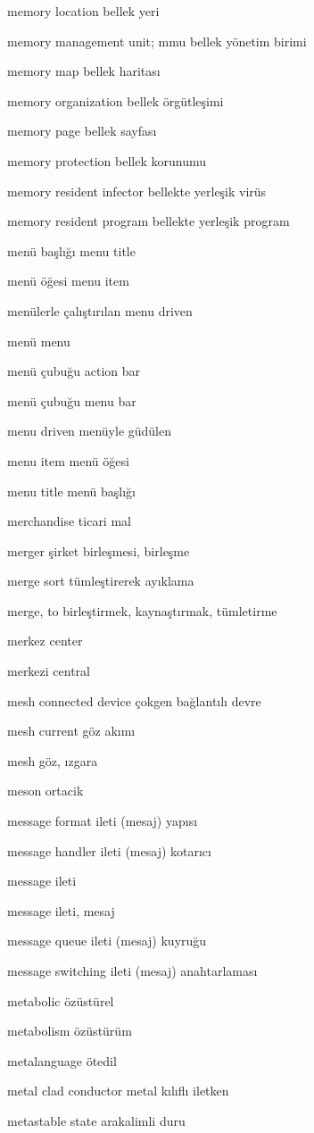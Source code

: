 \documentclass[12pt,fleqn]{article}\usepackage{../../common}
\begin{document}
memory location bellek yeri

memory management unit; mmu bellek yönetim birimi

memory map bellek haritası

memory organization bellek örgütleşimi

memory page bellek sayfası

memory protection bellek korunumu

memory resident infector bellekte yerleşik virüs

memory resident program bellekte yerleşik program

menü başlığı menu title

menü öğesi menu item

menülerle çalıştırılan menu driven

menü menu

menü çubuğu action bar

menü çubuğu menu bar

menu driven menüyle güdülen

menu item menü öğesi

menu title menü başlığı

merchandise ticari mal

merger şirket birleşmesi, birleşme

merge sort tümleştirerek ayıklama

merge, to birleştirmek, kaynaştırmak, tümletirme

merkez center

merkezi central

mesh connected device çokgen bağlantılı devre

mesh current göz akımı

mesh göz, ızgara

meson ortacik

message format ileti (mesaj) yapısı

message handler ileti (mesaj) kotarıcı

message ileti

message ileti, mesaj

message queue ileti (mesaj) kuyruğu

message switching ileti (mesaj) anahtarlaması

metabolic özüstürel

metabolism özüstürüm

metalanguage ötedil

metal clad conductor metal kılıflı iletken

metastable state arakalimli duru
\end{document}

